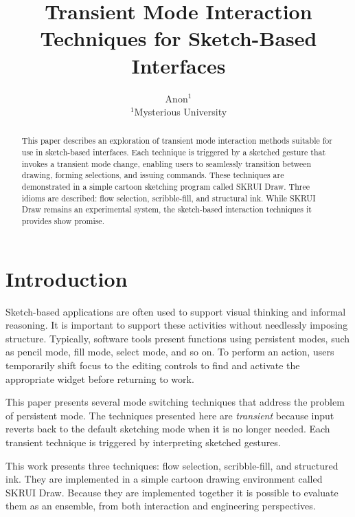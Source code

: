 \documentclass{egpubl}
\title[Transient Mode Techniques]
      {Transient Mode Interaction Techniques for Sketch-Based Interfaces}
\author[Anon]
       {Anon$^{1}$ \\
         $^1$Mysterious University\\
       }
\begin{document}
\maketitle

\begin{abstract}

This paper describes an exploration of transient mode interaction
methods suitable for use in sketch-based interfaces. Each technique is
triggered by a sketched gesture that invokes a transient mode change,
enabling users to seamlessly transition between drawing, forming
selections, and issuing commands. These techniques are demonstrated in
a simple cartoon sketching program called SKRUI Draw. Three idioms are
described: flow selection, scribble-fill, and structural ink. While
SKRUI Draw remains an experimental system, the sketch-based
interaction techniques it provides show promise.

\begin{classification} %
\end{classification}

\end{abstract}

\section{Introduction}

Sketch-based applications are often used to support visual thinking
and informal reasoning. It is important to support these activities
without needlessly imposing structure. Typically, software tools
present functions using persistent modes, such as pencil mode, fill
mode, select mode, and so on. To perform an action, users temporarily
shift focus to the editing controls to find and activate the
appropriate widget before returning to work.

This paper presents several mode switching techniques that address the
problem of persistent mode. The techniques presented here are
\emph{transient} because input reverts back to the default sketching
mode when it is no longer needed. Each transient technique is
triggered by interpreting sketched gestures.

This work presents three techniques: flow selection, scribble-fill,
and structured ink. They are implemented in a simple cartoon drawing
environment called SKRUI Draw. Because they are implemented together
it is possible to evaluate them as an ensemble, from both interaction
and engineering perspectives.
\end{document}
